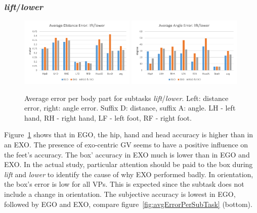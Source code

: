 \subsubsection{\textit{lift}/\textit{lower}}
\begin{figure}[H]
	\centering
	\includegraphics[width=0.49\textwidth]{figures/distanceErrorLiftLower.png}
	\includegraphics[width=0.49\textwidth]{figures/angleErrorLiftLower.png}
	\caption[Average error per body part for subtasks \textit{lift}/\textit{lower}.]{Average error per body part for subtasks \textit{lift}/\textit{lower}. Left: distance error, right: angle error. Suffix D: distance, suffix A: angle. LH - left hand, RH - right hand, LF - left foot, RF - right foot.}
	\label{fig:errorLiftLower}
\end{figure}
Figure~\ref{fig:errorLiftLower} shows that in EGO, the hip, hand and head accuracy is higher than in an EXO. The presence of exo-centric GV seems to have a positive influence on the feet's accuracy. The box' accuracy in EXO much is lower than in EGO and EXO. In the actual study, particular attention should be paid to the box during \textit{lift} and \textit{lower} to identify the cause of why EXO performed badly. In orientation, the box's error is low for all VPs. This is expected since the subtask does not include a change in orientation. The subjective accuracy is lowest in EGO, followed by EGO and EXO, compare figure~\ref{fig:avgErrorPerSubTask} (bottom).

